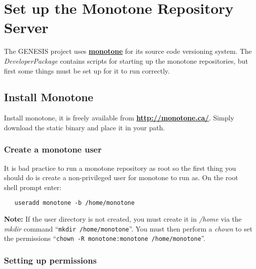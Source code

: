 \documentclass[12pt]{article}
\begin{document}
\section*{Set up the Monotone Repository Server}

The GENESIS project uses \href{http://www.monotone.ca/}{\bf monotone} for its source code versioning system. The {\it DeveloperPackage} contains scripts for starting up the monotone repositories, but first some things must be set up for it to run correctly.

\subsection*{Install Monotone}

Install monotone, it is freely available from \href{http://monotone.ca/}{\bf http://monotone.ca/}. Simply download the static binary and place it in your path.

\subsubsection*{Create a monotone user}

It is bad practice to run a monotone repository as root so the first thing you should do is create a non-privileged user for monotone to run as. On the root shell prompt enter:
\begin{verbatim}
   useradd monotone -b /home/monotone
\end{verbatim}
{\bf Note:} If the user directory is not created, you must create it in  {\it /home} via the {\it mkdir} command ``{\tt mkdir /home/monotone}''. You must then perform a {\it chown} to set the permissions ``{\tt chown -R monotone:monotone /home/monotone}''.

\subsubsection*{Setting up permissions}
\end{document}
